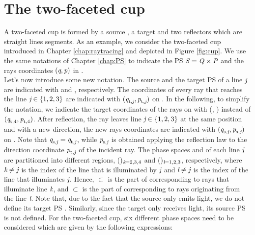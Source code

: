 \section{The two-faceted cup}
A two-faceted cup is formed by a source , a target  and two reflectors which are straight lines segments. 
As an example, we consider the two-faceted cup introduced in Chapter \ref{chap:raytracing} and depicted in Figure \ref{fig:cup}.
We use the same notations of Chapter \ref{chap:PS} to indicate the PS $\mbox{$\emph{S}_{\textit{}}$}=\mbox{$\emph{Q}_{\textit{}}$}\times\mbox{$\emph{P}_{\textit{}}$}$ and the rays coordinates 
$(\textit{q}, \textit{p})$ in .\\ \indent
Let's now introduce some new notation. 
The source and the target PS of a line $\textit{j}$ are indicated with  and , respectively.
The coordinates of every ray that reaches the line $\textit{j}\in\{1, 2, 3\}$ are indicated  with $(\textit{q}_{\textrm{t,} \textit{\textit{j}}}, \textit{p}_{\textrm{t,} \textit{\textit{j}}})$ on . 
In the following, to simplify the notation, we indicate the target coordinates of the rays on  with (, ) instead of $(\textit{q}_{\textrm{t,} \textit{$4$}}, \textit{p}_{\textrm{t,} \textit{$4$}})$.
After reflection, the ray leaves line $\textit{j} \in\{1, 2, 3\}$ at the same position and with a new direction, the new rays coordinates are indicated with 
$(\textit{q}_{\textrm{s,} \textit{\textit{j}}}, \textit{p}_{\textrm{s,} \textit{\textit{j}}})$ on .
Note that $\textit{q}_{\textrm{s,} \textit{\textit{j}}}= \textit{q}_{\textrm{t,} \textit{\textit{j}}}$, while $\textit{p}_{\textrm{s,} \textit{\textit{j}}}$ is obtained applying the reflection law to the direction coordinate $\textit{p}_{\textrm{t,} \textit{\textit{j}}}$ of the incident ray.
The phase spaces  and   of each line $\textit{j}$ are partitioned into different regions, ()$_{\textit{k}=2, 3, 4}$ and ()$_{\textit{l}=1, 2, 3}$, respectively, where $\textit{k}\neq \textit{j}$ is the index of the line that is illuminated by $\textit{j}$ and $\textit{l}\neq\textit{j}$ is the index of the line that illuminates $\textit{j}$. Hence, $\subset$  is the part of  corresponding to rays that illuminate line $\textit{k}$, and  $\subset$  is the part of  corresponding to rays originating from the line $\textit{l}$. Note that, due to the fact that the source only emits light, we do not define its target PS . Similarly, since the target only receives light, its source PS  is not defined.
For the two-faceted cup, six different phase spaces need to be considered which are given by the following expressions:
